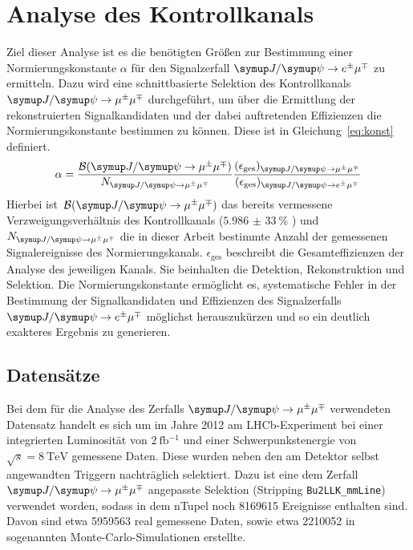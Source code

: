 \chapter{Analyse des Kontrollkanals}
\label{chap:4}
%
Ziel dieser Analyse ist es die benötigten Größen zur Bestimmung einer Normierungskonstante $\alpha$ für den Signalzerfall $\signal$ zu ermitteln. Dazu wird eine schnittbasierte Selektion des Kontrollkanals $\kontroll$ durchgeführt, um über die Ermittlung der rekonstruierten Signalkandidaten und der dabei auftretenden Effizienzen die Normierungskonstante bestimmen zu können. Diese ist in Gleichung~\ref{eq:konst} definiert.
%
\begin{equation}
  \alpha=\frac{\mathcal{B}(\kontroll)}{N_{\kontroll}}\frac{(\epsilon_{\text{ges}})_{\kontroll}}{(\epsilon_{\text{ges}})_{\signal}}
  \label{eq:konst}
\end{equation}
%
Hierbei ist~$\mathcal{B}(\kontroll)$ das bereits vermessene Verzweigungsverhältnis des Kontrollkanals ($\SI{5,986(33)}{\percent}$ \cite{pdg}) und~$N_{\kontroll}$ die in dieser Arbeit bestimmte Anzahl der gemessenen Signalereignisse des Normierungskanals.
$\epsilon_{\text{ges}}$ beschreibt die Gesamteffizienzen der Analyse des jeweiligen Kanals. Sie beinhalten die Detektion, Rekonstruktion und Selektion. Die Normierungskonstante ermöglicht es, systematische Fehler in der Bestimmung der Signalkandidaten und Effizienzen des Signalzerfalls $\signal$ möglichst herauszukürzen und so ein deutlich exakteres Ergebnis zu generieren.

\section{Datensätze}
%
Bei dem für die Analyse des Zerfalls $\kontroll$ verwendeten Datensatz handelt es sich um im Jahre 2012 am LHCb-Experiment bei einer integrierten Luminosität von $\SI{2}{\femto\barn^{-1}}$ und einer Schwerpunkstenergie von $\sqrt{s}=\SI{8}{\tera\electronvolt}$ gemessene Daten. Diese wurden neben den am Detektor selbst angewandten Triggern nachträglich selektiert. Dazu ist eine dem Zerfall $\kontroll$ angepasste Selektion (Stripping \texttt{Bu2LLK\_mmLine}) verwendet worden, sodass in dem nTupel noch 8169615 Ereignisse enthalten sind. Davon sind etwa 5959563 real gemessene Daten, sowie etwa 2210052 in sogenannten Monte-Carlo-Simulationen erstellte.\\


